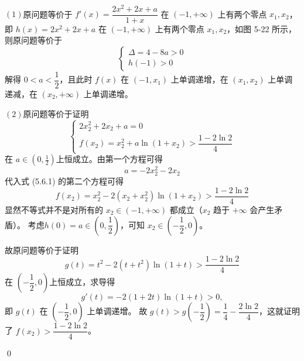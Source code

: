 \begin{jie}
    \                  

    \((1)\)原问题等价于 $f'(x) = \dfrac{2x^2 + 2x + a}{1 + x}$ 在 $(-1, +\infty)$ 上有两个零点 $x_1, x_2$，即 $h(x) = 2x^2 + 2x + a$ 在 $(-1, +\infty)$ 上有两个零点 $x_1, x_2$，如图 5-22 所示，则原问题等价于
    \[
    \begin{cases}
        \Delta = 4 - 8a > 0 \\
        h(-1) > 0
    \end{cases}
    \]
    解得 $0 < a < \dfrac{1}{2}$，且此时 $f(x)$ 在 $(-1, x_1)$ 上单调递增，在 $(x_1, x_2)$ 上单调递减，在 $(x_2, +\infty)$ 上单调递增。

    \((2)\)原问题等价于证明
    \[
    \begin{cases}
        2x_2^2 + 2x_2 + a = 0 \\
        f(x_2) = x_2^2 + a \ln(1 + x_2) > \dfrac{1 - 2\ln 2}{4}
    \end{cases}
    \]
    在 $a \in \left(0, \frac{1}{2}\right)$上恒成立。由第一个方程可得
    \[a = -2x_2^2 - 2x_2 \]
    代入式 (5.6.1) 的第二个方程可得
    \[f(x_2) = x_2^2 - 2(x_2 + x_2^2) \ln(1 + x_2) > \frac{1 - 2\ln 2}{4} \]
    显然不等式并不是对所有的 $x_2 \in (-1, +\infty)$ 都成立（$x_2$ 趋于 $+\infty$ 会产生矛盾）。
    考虑\(h(0)=a\in(0,\dfrac{1}{2})\)，可知 $x_2 \in \left(-\dfrac{1}{2}, 0\right)$。

    故原问题等价于证明 $$g(t) = t^2 - 2(t + t^2) \ln(1 + t) > \frac{1 - 2\ln 2}{4}$$
    在 $\left(-\dfrac{1}{2}, 0\right)$上恒成立，求导得
    \[g'(t) = -2(1 + 2t) \ln(1 + t) > 0, \]
    即 $g(t)$ 在 $\left(-\dfrac{1}{2}, 0\right)$ 上单调递增。
    故 $g(t) > g\left(-\dfrac{1}{2}\right) = \dfrac{1}{4} - \dfrac{2\ln 2}{4}$，这就证明了 $f(x_2) > \dfrac{1 - 2\ln 2}{4}$。

    \qed
\end{jie}

